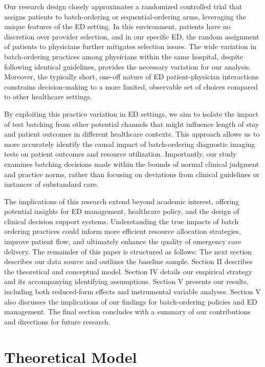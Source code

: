 \documentclass{article}
\begin{document}
Our research design closely approximates a randomized controlled trial
that assigns patients to batch-ordering or sequential-ordering arms,
leveraging the unique features of the ED setting. In this environment,
patients have no discretion over provider selection, and in our specific
ED, the random assignment of patients to physicians further mitigates
selection issues. The wide variation in batch-ordering practices among
physicians within the same hospital, despite following identical
guidelines, provides the necessary variation for our analysis. Moreover,
the typically short, one-off nature of ED patient-physician interactions
constrains decision-making to a more limited, observable set of choices
compared to other healthcare settings.

By exploiting this practice variation in ED settings, we aim to isolate
the impact of test batching from other potential channels that might
influence length of stay and patient outcomes in different healthcare
contexts. This approach allows us to more accurately identify the causal
impact of batch-ordering diagnostic imaging tests on patient outcomes
and resource utilization. Importantly, our study examines batching
decisions made within the bounds of normal clinical judgment and
practice norms, rather than focusing on deviations from clinical
guidelines or instances of substandard care.

The implications of this research extend beyond academic interest,
offering potential insights for ED management, healthcare policy, and
the design of clinical decision support systems. Understanding the true
impacts of batch ordering practices could inform more efficient resource
allocation strategies, improve patient flow, and ultimately enhance the
quality of emergency care delivery. The remainder of this paper is
structured as follows: The next section describes our data source and
outlines the baseline sample. Section II describes the theoretical and
conceptual model. Section IV details our empirical strategy and its
accompanying identifying assumptions. Section V presents our results,
including both reduced-form effects and instrumental variable analyses.
Section V also discusses the implications of our findings for
batch-ordering policies and ED management. The final section concludes
with a summary of our contributions and directions for future research.

\hypertarget{theoretical-model}{%
\section{Theoretical Model}\label{theoretical-model}}
\end{document}
